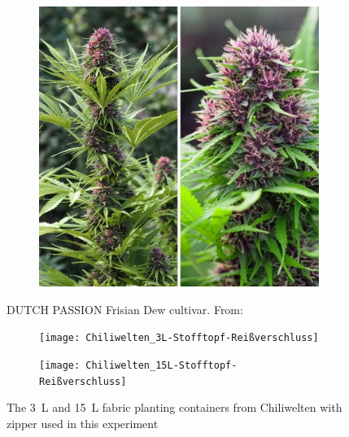 \begin{figure}[H]
\begin{minipage}[t]{0.48\textwidth}
\begin{subfigure}[t]{.48\textwidth}
            \label{fig:cannabis_frisian-dew_1}
        \end{subfigure}
        \begin{subfigure}[t]{.48\textwidth}
            \includegraphics[width=\linewidth]{DUTCH-PASSION_Frisian-Dew_2}
            \label{fig:cannabis_frisian-dew_2}
        \end{subfigure}
        \caption[DUTCH PASSION Frisian Dew]{DUTCH PASSION Frisian Dew cultivar. From: }
        \label{fig:cannabis_frisian-dew}
    \end{minipage}
\end{figure}

\begin{figure}[H]
    \begin{subfigure}[t]{.48\textwidth}
        \texttt{[image: Chiliwelten\_3L-Stofftopf-Reißverschluss]}
        \label{fig:planting-container-3L}
    \end{subfigure}
    \hfill
    \begin{subfigure}[t]{.48\textwidth}
        \texttt{[image: Chiliwelten\_15L-Stofftopf-Reißverschluss]}
        \label{fig:planting-container-15L}
    \end{subfigure}
    \caption[Planting containers used in this experiment]{The \qty[mode=text]{3}{\L} and \qty[mode=text]{15}{\L} fabric planting containers from Chiliwelten with zipper used in this experiment}
    \label{fig:planting-containers}
\end{figure}

